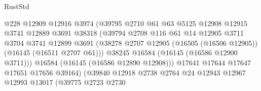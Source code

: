 \begin{lexlean}{RustStd}
\begin{coremodule}
                                      @228
                                      @12909
                                      @12916
                                      @3974
                                      (@39795
                                        @2710
                                        @61
                                        @63
                                        @5125
                                        @12908
                                        @12915
                                        @3741
                                        @12889
                                        @3691
                                        @38318
                                        (@39794
                                          @2708
                                          @116
                                          @61
                                          @14
                                          @12905
                                          @3711
                                          @3704
                                          @3741
                                          @12899
                                          @3691
                                          (@38278
                                            @2707
                                            @12905
                                            (@16505 (@16506 @12905))
                                            (@16145 (@16511 @2707 @61)))
                                          @38245
                                          @16584
                                          (@16145 (@16586 @12900 @3711)))
                                        @16584
                                        (@16145 (@16586 @12890 @12908)))
                                      @17641
                                      @17644
                                      @17647
                                      @17651
                                      @17656
                                      @39164)
                                    (@39840
                                      @12918
                                      @2738
                                      @2764
                                      @24
                                      @12943
                                      @12967
                                      @12993
                                      @13017
                                      (@39775
                                        @2723
                                        @2730

\end{coremodule}
\end{lexlean}
